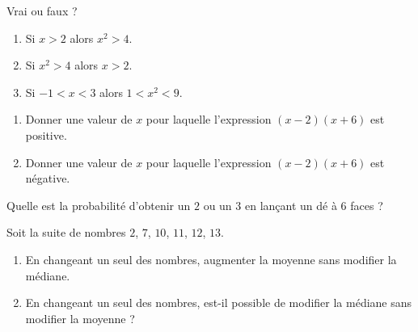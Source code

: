\begin{MentalActivity}
    \begin{mental}
        Vrai ou faux ?
        \begin{enumerate}
            \item
                Si \( x>2 \) alors \( x^2>4\).
            \item
                Si \( x^2>4\) alors \( x>2\).
            \item
                Si \( -1<x<3\) alors \( 1<x^2<9\).
        \end{enumerate}
    \end{mental}
    \begin{mental}
        \begin{enumerate}
            \item
                Donner une valeur de \( x\) pour laquelle l'expression \( (x-2)(x+6)\) est positive.
            \item
                Donner une valeur de \( x\) pour laquelle l'expression \( (x-2)(x+6)\) est négative.
        \end{enumerate}
    \end{mental}
    \begin{mental}
        Quelle est la probabilité d'obtenir un \( 2\) ou un \( 3\) en lançant un dé à \( 6\) faces ?
    \end{mental}
    \begin{mental}
        Soit la suite de nombres \( 2\), \( 7\), \( 10\), \( 11\), \( 12\), \( 13\).
        \begin{enumerate}
            \item
                En changeant un seul des nombres, augmenter la moyenne sans modifier la médiane.
            \item
                En changeant un seul des nombres, est-il possible de modifier la médiane sans modifier la moyenne ?
        \end{enumerate}
    \end{mental}
\end{MentalActivity}

